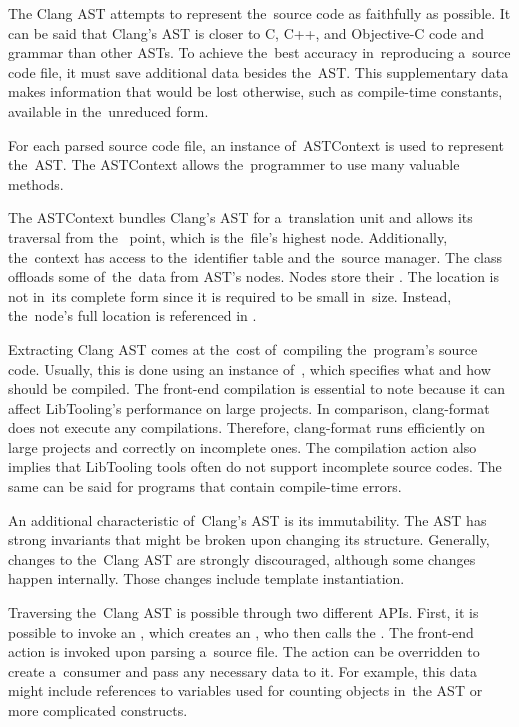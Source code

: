 The Clang AST attempts to represent the~source code as faithfully 
as possible. 
It can be said that Clang's AST is closer to C, C++, 
and Objective-C code and grammar than other ASTs. 
To achieve the~best accuracy in~reproducing a~source code file, 
it must save additional data besides the~AST. 
This supplementary data makes information that would be lost 
otherwise, such as compile-time constants, available 
in the~unreduced form. 

For each parsed source code file, an instance of~ASTContext 
is used to represent the~AST. 
The ASTContext allows the~programmer to use many valuable methods. 


The ASTContext bundles Clang's AST for a~translation unit 
and allows its traversal from the~
point, which is the~file's highest node. 
Additionally, the~context has access to the~identifier table 
and the~source manager. 
The  class offloads some of~the~data 
from AST's nodes. 
Nodes store their . 
The location is not in~its complete form since it is required 
to be small in~size. 
Instead, the~node's full location is referenced 
in .

Extracting Clang AST comes at the~cost of~compiling the~program's
source code. 
Usually, this is done using an instance of~, 
which specifies what and how should be compiled. 
The front-end compilation is essential to note because it can affect 
LibTooling's performance on large projects. 
In comparison, clang-format does not execute any compilations. 
Therefore, clang-format runs efficiently on large projects 
and correctly on incomplete ones. 
The compilation action also implies that LibTooling tools often 
do not support incomplete source codes. 
The same can be said for programs that contain compile-time errors.

An additional characteristic of~Clang's AST is its immutability. 
The AST has strong invariants that might be broken upon changing 
its structure. 
Generally, changes to the~Clang AST are strongly discouraged, 
although some changes happen internally. 
Those changes include template instantiation.

Traversing the~Clang AST is possible through two different APIs. 
First, it is possible to invoke an , which 
creates an , who then calls 
the . 
The front-end action is invoked upon parsing a~source file. 
The action can be overridden to create a~consumer and pass any necessary 
data to it. 
For example, this data might include references to variables used for 
counting objects in~the AST or more complicated constructs. 

